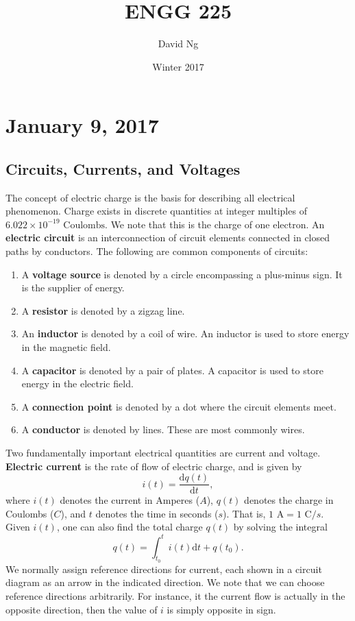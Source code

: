\documentclass[11pt]{article}
\theoremstyle{plain} %
\theoremstyle{definition}
\theoremstyle{example}
\theoremstyle{remark}
\begin{document}
\title{ENGG 225}
\author{David Ng}
\date{Winter 2017}
\maketitle

\tableofcontents

\eject


\section{January 9, 2017}
\subsection{Circuits, Currents, and Voltages}

The concept of electric charge is the basis for describing all electrical phenomenon. Charge exists in discrete quantities at integer multiples of $6.022 \times 10^{-19} \text{ Coulombs}$.
We note that this is the charge of one electron. An \textbf{electric circuit} is an interconnection of circuit elements connected in closed paths 
by conductors. The following are common components of circuits:

\begin{enumerate}
	\item A \textbf{voltage source} is denoted by a circle encompassing a plus-minus sign. It is the supplier of energy. 
	\item A \textbf{resistor} is denoted by a zigzag line.
	\item An \textbf{inductor} is denoted by a coil of wire. An inductor is used to store energy in the magnetic field. 
	\item A \textbf{capacitor} is denoted by a pair of plates. A capacitor is used to store energy in the electric field. 
	\item A \textbf{connection point} is denoted by a dot where the circuit elements meet. 
	\item A \textbf{conductor} is denoted by lines. These are most commonly wires. 
\end{enumerate}

Two fundamentally important electrical quantities are current and voltage. \textbf{Electric current} is the rate of flow of electric charge, and is given by 
$$i(t) = \frac{\mathrm d q(t)}{\mathrm d t},$$
where $i(t)$ denotes the current in Amperes ($A$), $q(t)$ denotes the charge in Coulombs ($C$), and $t$ denotes the time in seconds ($s$). That is, $1 \text{ A} = 1 \text{ C}/s$. Given $i(t)$, one can also find the total charge $q(t)$ by solving the integral
$$q(t) = \int_{t_0}^ti(t) \mathrm d t + q(t_0).$$
We normally assign reference directions for current, each shown in a circuit diagram as an arrow in the indicated direction. We note that we can choose reference directions arbitrarily. For instance, it the current flow is actually in the opposite direction, then the value of $i$ is simply opposite in sign. 
\end{document}

